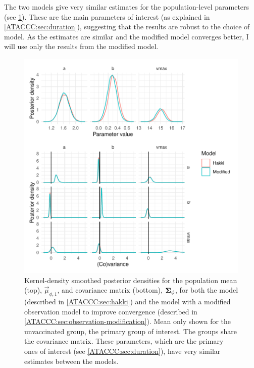 \documentclass[thesis.tex]{subfiles}
\begin{document}
The two models give very similar estimates for the population-level parameters (see \cref{ATACCC:fig:compare-hakki-modified}).
These are the main parameters of interest (as explained in \cref{ATACCC:sec:duration}), suggesting that the results are robust to the choice of model.
As the estimates are similar and the modified model converges better, I will use only the results from the modified model.
\begin{figure}
  \centering \includegraphics{ATACCC/compare_hakki_modified}
  \caption[Comparison of population-level parameters between models.]{Kernel-density smoothed posterior densities for the population mean (top), $\vec{\mu}_{\phi,1}$, and covariance matrix (bottom), $\bm{\Sigma}_\phi$, for both the \textcite{hakkiOnset} model (described in \cref{ATACCC:sec:hakki}) and the model with a modified observation model to improve convergence (described in \cref{ATACCC:sec:observation-modification}). Mean only shown for the unvaccinated group, the primary group of interest. The groups share the covariance matrix. These parameters, which are the primary ones of interest (see \cref{ATACCC:sec:duration}), have very similar estimates between the models. \label{ATACCC:fig:compare-hakki-modified}}
\end{figure}
\end{document}
